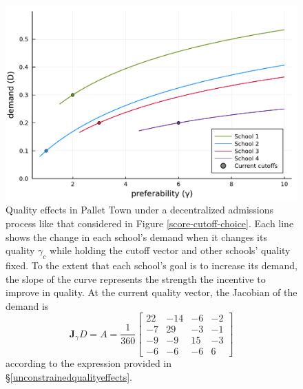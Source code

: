 \documentclass[12pt]{article}
\theoremstyle{definition}
\begin{document}
\begin{figure}
\begin{center}\includegraphics[width=\linewidth, ]{plots/vary-gamma-demand.pdf}\end{center}
\captionsetup{singlelinecheck=off}
    \caption[.]{Quality effects in Pallet Town under a decentralized admissions process like that considered in Figure \ref{score-cutoff-choice}. Each line shows the change in each school’s demand when it changes its quality $\gamma_c$ while holding the cutoff vector and other schools’ quality fixed. To the extent that each school's goal is to increase its demand, the slope of the curve represents the strength the incentive to improve in quality. At the current quality vector, the Jacobian of the demand is
    \begin{equation*}
    \mathbf{J}_\gamma D = A = \frac{1}{360}
    \begin{bmatrix}
22 & -14 & -6&  -2\\
 -7   &29  &-3  &-1\\
 -9   &-9  &15  &-3\\
 -6   &-6&  -6  & 6
    \end{bmatrix}
    \end{equation*} 
    according to the expression provided in \S\ref{unconstrainedqualityeffects}. }
\label{vary-gamma-demand}
\end{figure}
\end{document}

